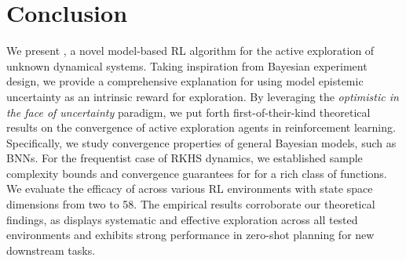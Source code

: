 \section{Conclusion}
We present \opacex, a novel model-based RL algorithm for the active exploration of unknown dynamical systems. Taking inspiration from Bayesian experiment design, we provide a comprehensive explanation for using model epistemic uncertainty as an intrinsic reward for exploration. 
By leveraging the \emph{optimistic in the face of uncertainty} paradigm, we put forth first-of-their-kind theoretical results on the convergence of active exploration agents in reinforcement learning. Specifically, we study convergence properties of general Bayesian models, such as BNNs. For the frequentist case of RKHS dynamics, we established sample complexity bounds and convergence guarantees for \opacex for a rich class of functions.
 We evaluate the efficacy of \opacex across various RL environments with state space dimensions from two to 58. The empirical results corroborate our theoretical findings, as \opacex displays systematic and effective exploration across all tested environments and exhibits strong performance in zero-shot planning for new downstream tasks.
